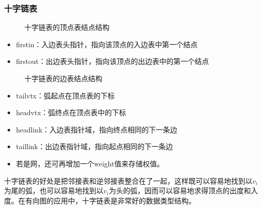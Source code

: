 \begin{frame}\ft{\subsecname}
  
\end{frame}

\begin{frame}\ft{\subsecname}
  
\end{frame}


\subsubsection{十字链表}
\begin{frame}  
  \begin{figure}
    \centering
    
    \caption{十字链表的顶点表结点结构}    
  \end{figure}  
  \begin{itemize}
  \item \tf firstin：入边表头指针，指向该顶点的入边表中第一个结点\\[0.1in]
  \item \tf firstout：出边表头指针，指向该顶点的出边表中的第一个结点
  \end{itemize}

\end{frame}

\begin{frame}  
  \begin{figure}
    \centering
    
    \caption{十字链表的边表结点结构}    
  \end{figure}  
  
  \begin{itemize}
  \item \tf tailvtx：弧起点在顶点表的下标 \\[0.1in]
  \item \tf headvtx：弧终点在顶点表中的下标 \\[0.1in]
  \item \tf headlink：入边表指针域，指向终点相同的下一条边 \\[0.1in]
  \item \tf taillink：出边表指针域，指向起点相同的下一条边 \\[0.1in]
  \item \tf 若是网，还可再增加一个weight值来存储权值。
  \end{itemize}
\end{frame}

\begin{frame}\ft{\subsubsecname}
  \begin{figure}
    \centering
    
  \end{figure}

\end{frame}


\begin{frame}\ft{\subsubsecname}
  十字链表的好处是把邻接表和逆邻接表整合在了一起，这样既可以容易地找到以$v_i$为尾的弧，也可以容易地找到以$v_i$为头的弧，因而可以容易地求得顶点的出度和入度。在有向图的应用中，十字链表是非常好的数据类型结构。
\end{frame}
